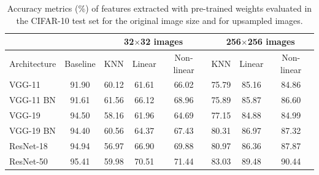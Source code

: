 \begin{table}[h]
    \centering       
    \caption[Accuracy metrics for original and upsampled CIFAR-10 images]{\label{tab:feat_extr_results_pretrained} Accuracy metrics (\%) of features extracted with pre-trained weights evaluated in the CIFAR-10 test set for the original image size and for upsampled images.}     
    \begin{tabular}{lccccccc}
        \hline 
        {} & \multicolumn{1}{c}{} & \multicolumn{3}{c}{32$\times$32 images}& \multicolumn{3}{c}{256$\times$256 images}\tabularnewline
        \hline
        {Architecture} & \multicolumn{1}{c|}{Baseline} & {KNN} & {Linear} & {Non-linear} & \multicolumn{1}{|c}{KNN} & {Linear} & {Non-linear} \tabularnewline
         \hline
        VGG-11 & 91.90  & 60.12 & 61.61 & 66.02  &  75.79 & 85.16  & 84.86 \tabularnewline %
        VGG-11 BN & 91.61 & 61.56 & 66.12  & 68.96 & 75.89  &  85.87 &  86.60 \tabularnewline %
        VGG-19 & 94.50 & 58.16 & 61.96 & 64.69  & 77.15  & 84.88  & 84.99 \tabularnewline %
        VGG-19 BN & 94.40 & 60.56 & 64.37 & 67.43  & 80.31 & 86.97 & 87.32 \tabularnewline
        ResNet-18 & 94.94 & 56.97 & 66.90 & 69.88  & 80.97  &  86.36 & 87.87 \tabularnewline%
        ResNet-50 & 95.41 & 59.98 & 70.51  & 71.44 & 83.03  &  89.48 &  90.44\tabularnewline
        \hline
    \end{tabular} 
\end{table}

